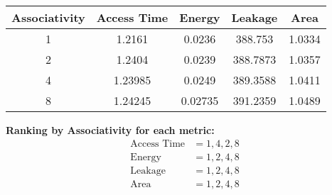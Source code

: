 \documentclass[a4paper, 11pt]{exam}
\begin{document}
\begin{enumerate}
\begin{enumerate}
    \begin{center}
	\begin{tabular}{ |c|c|c|c|c|} 
		\hline
		\textbf{Associativity}& \textbf{Access Time}& \textbf{Energy} & \textbf{Leakage} & \textbf{Area} \\ 
		\hline
		1 & 1.2161 & 0.0236 & 388.753 & 1.0334\\
		\hline
		2 & 1.2404 & 0.0239 & 388.7873 & 1.0357 \\
		\hline
		4 & 1.23985 & 0.0249 & 389.3588 & 1.0411\\
		\hline
		8 & 1.24245 & 0.02735 & 391.2359 & 1.0489\\
		\hline
	\end{tabular}
\end{center}

\textbf{Ranking by Associativity for each metric:}
\begin{align*}
\text{Access Time} &= 1, 4, 2, 8\\
\text{Energy} &= 1, 2, 4, 8\\
\text{Leakage} &= 1, 2, 4, 8\\
\text{Area} &= 1, 2, 4, 8 \\
\end{align*}

\end{enumerate}

\end{enumerate}
\end{document}
